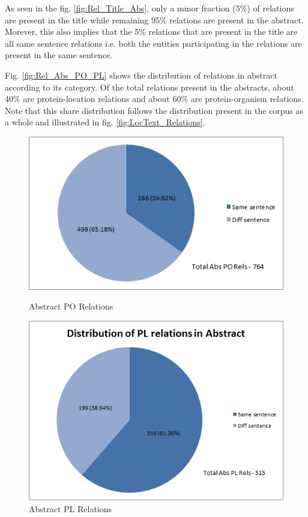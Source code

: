 As seen in the fig. \ref{fig:Rel_Title_Abs}, only a minor fraction (5\%) of relations are present in the title while remaining 95\% relations are present in the abstract. Morever, this also implies that the 5\% relations that are present in the title are all same sentence relations i.e. both the entities participating in the relations are present in the same sentence.

Fig. \ref{fig:Rel_Abs_PO_PL} shows the distribution of relations in abstract according to its category. Of the total relations present in the abstracts, about 40\% are protein-location relations and about 60\% are protein-organism relations. Note that this share distribution follows the distribution present in the corpus as a whole and illustrated in fig. \ref{fig:LocText_Relations}.

\begin{figure}
\centering
\begin{minipage}{.5\textwidth}
  \centering
  \includegraphics[width=.95\textwidth]{figures/AbsPORels_sent_Distribution.png}
  \caption{Abstract PO Relations}
  \label{fig:Abs_PO_Rel}
\end{minipage}%
\begin{minipage}{.5\textwidth}
  \centering
  \includegraphics[width=.95\textwidth]{figures/AbsPLRels_sent_Distribution.png}
  \caption{Abstract PL Relations}
  \label{fig:Abs_PL_Rel}
\end{minipage}
\end{figure}

